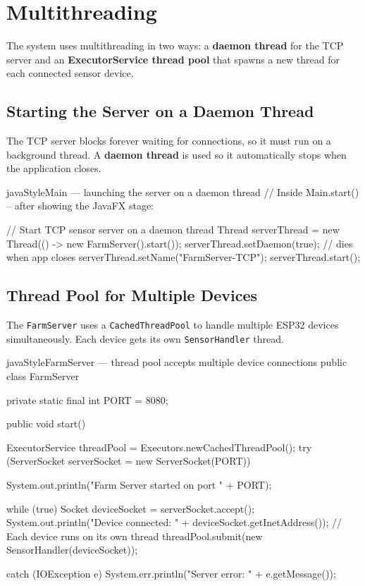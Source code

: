 \documentclass[12pt, a4paper]{report}
\begin{document}
\section{Multithreading}

The system uses multithreading in two ways: a \textbf{daemon thread} for the TCP server and an \textbf{ExecutorService thread pool} that spawns a new thread for each connected sensor device.

\subsection{Starting the Server on a Daemon Thread}

The TCP server blocks forever waiting for connections, so it must run on a background thread. A \textbf{daemon thread} is used so it automatically stops when the application closes.

\begin{codeblock}{javaStyle}{Main --- launching the server on a daemon thread}
// Inside Main.start() -- after showing the JavaFX stage:

// Start TCP sensor server on a daemon thread
Thread serverThread = new Thread(() -> new FarmServer().start());
serverThread.setDaemon(true);       // dies when app closes
serverThread.setName("FarmServer-TCP");
serverThread.start();
\end{codeblock}

\subsection{Thread Pool for Multiple Devices}

The \texttt{FarmServer} uses a \texttt{CachedThreadPool} to handle multiple ESP32 devices simultaneously. Each device gets its own \texttt{SensorHandler} thread.

\begin{codeblock}{javaStyle}{FarmServer --- thread pool accepts multiple device connections}
public class FarmServer {
    private static final int PORT = 8080;

    public void start() {
        ExecutorService threadPool = Executors.newCachedThreadPool();
        try (ServerSocket serverSocket = new ServerSocket(PORT)) {
            System.out.println("Farm Server started on port " + PORT);

            while (true) {
                Socket deviceSocket = serverSocket.accept();
                System.out.println("Device connected: "
                    + deviceSocket.getInetAddress());
                // Each device runs on its own thread
                threadPool.submit(new SensorHandler(deviceSocket));
            }
        } catch (IOException e) {
            System.err.println("Server error: " + e.getMessage());
        }
    }
}
\end{codeblock}
\end{document}

